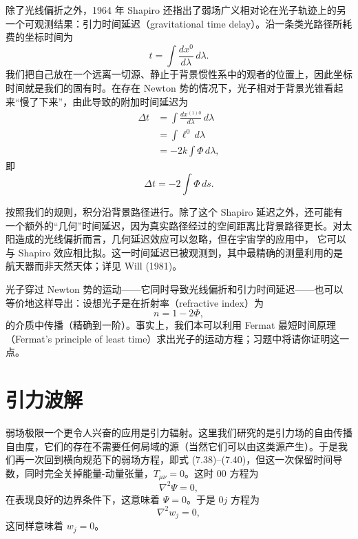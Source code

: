 除了光线偏折之外，1964 年 Shapiro 还指出了弱场广义相对论在光子轨迹上的另一个可观测结果：引力时间延迟（gravitational time delay）。沿一条类光路径所耗费的坐标时间为
\begin{equation*}
t = \int\frac{dx^0}{d\lambda}\, d\lambda.
\tag{7.82}
\end{equation*}
我们把自己放在一个远离一切源、静止于背景惯性系中的观者的位置上，因此坐标时间就是我们的固有时。在存在 Newton 势的情况下，光子相对于背景光锥看起来“慢了下来”，由此导致的附加时间延迟为
\begin{align*}
\Delta t &= \int\frac{dx^{(1)0}}{d\lambda}\, d\lambda \\
&= \int \ell^0\, d\lambda \\
&= -2k\int \Phi\, d\lambda,
\tag{7.83}
\end{align*}
即
\begin{equation*}
\Delta t = -2\int \Phi\, ds.
\tag{7.84}
\end{equation*}

按照我们的规则，积分沿背景路径进行。除了这个 Shapiro 延迟之外，还可能有一个额外的“几何”时间延迟，因为真实路径经过的空间距离比背景路径更长。对太阳造成的光线偏折而言，几何延迟效应可以忽略，但在宇宙学的应用中，
它可以与 Shapiro 效应相比拟。这一时间延迟已被观测到，其中最精确的测量利用的是航天器而非天然天体；详见 Will (1981)。

光子穿过 Newton 势的运动——它同时导致光线偏折和引力时间延迟——也可以等价地这样导出：设想光子是在折射率（refractive index）为
\begin{equation*}
n = 1 - 2\Phi,
\tag{7.85}
\end{equation*}
的介质中传播（精确到一阶）。事实上，我们本可以利用 Fermat 最短时间原理（Fermat's principle of least time）求出光子的运动方程；习题中将请你证明这一点。

\section{引力波解}

弱场极限一个更令人兴奋的应用是引力辐射。这里我们研究的是引力场的自由传播自由度，它们的存在不需要任何局域的源（当然它们可以由这类源产生）。于是我们再一次回到横向规范下的弱场方程，即式 (7.38)--(7.40)，但这一次保留时间导数，同时完全关掉能量-动量张量，$T_{\mu\nu} = 0$。这时 00 方程为
\begin{equation*}
\nabla^2\Psi = 0,
\tag{7.86}
\end{equation*}
在表现良好的边界条件下，这意味着 $\Psi = 0$。于是 $0j$ 方程为
\begin{equation*}
\nabla^2 w_j = 0,
\tag{7.87}
\end{equation*}
这同样意味着 $w_j = 0$。

